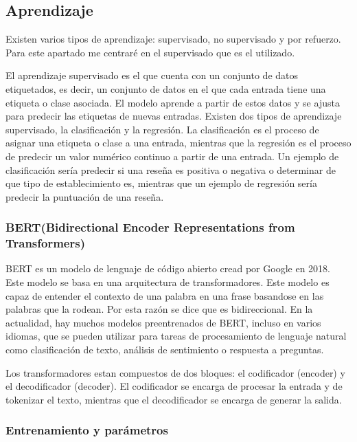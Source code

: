 \subsection{Aprendizaje}

Existen varios tipos de aprendizaje: supervisado, no supervisado y por refuerzo.
Para este apartado me centraré en el supervisado que es el utilizado.

El aprendizaje supervisado es el que cuenta con un conjunto de datos etiquetados, es decir, un conjunto de datos en el que cada entrada tiene una etiqueta o clase asociada.
El modelo aprende a partir de estos datos y se ajusta para predecir las etiquetas de nuevas entradas.
Existen dos tipos de aprendizaje supervisado, la clasificación y la regresión.
La clasificación es el proceso de asignar una etiqueta o clase a una entrada, mientras que la regresión es el proceso de predecir un valor numérico continuo a partir de una entrada.
Un ejemplo de clasificación sería predecir si una reseña es positiva o negativa o determinar de que tipo de establecimiento es, mientras que un ejemplo de regresión sería predecir la puntuación de una reseña.\cite{aprendizajes}

\subsubsection{BERT(Bidirectional Encoder Representations from Transformers)}

BERT es un modelo de lenguaje de código abierto cread por Google en 2018. Este modelo se basa en una arquitectura de transformadores.
Este modelo es capaz de entender el contexto de una palabra en una frase basandose en las palabras que la rodean. Por esta razón se dice que es bidireccional.\cite{datacamp:bert}
En la actualidad, hay muchos modelos preentrenados de BERT, incluso en varios idiomas, que se pueden utilizar para tareas de procesamiento de lenguaje natural como clasificación de texto, análisis de sentimiento o respuesta a preguntas.

Los transformadores estan compuestos de dos bloques: el codificador (encoder) y el decodificador (decoder).
El codificador se encarga de procesar la entrada y de tokenizar el texto, mientras que el decodificador se encarga de generar la salida.\cite{datacamp:transformers}

\subsubsection{Entrenamiento y parámetros}

